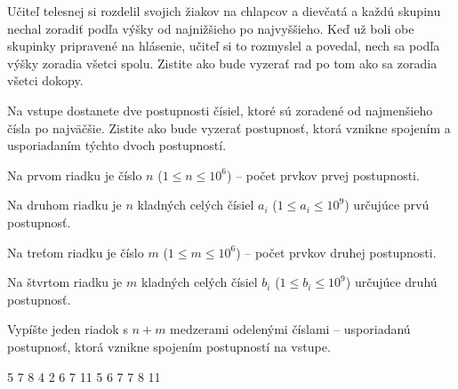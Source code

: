 




Učiteľ telesnej si rozdelil svojich žiakov na chlapcov a dievčatá a každú skupinu nechal zoradiť
podľa výšky od najnižšieho po najvyššieho. Keď už boli obe skupinky pripravené na hlásenie, učiteľ
si to rozmyslel a povedal, nech sa podľa výšky zoradia všetci spolu. Zistite ako bude vyzerať rad po
tom ako sa zoradia všetci dokopy.


Na vstupe dostanete dve postupnosti čísiel, ktoré sú zoradené od najmenšieho čísla po najväčšie.
Zistite ako bude vyzerať postupnosť, ktorá vznikne spojením a usporiadaním týchto dvoch postupností.


Na prvom riadku je číslo $n$ ($1 \leq n \leq 10^6$) -- počet prvkov prvej postupnosti.

Na druhom riadku je $n$ kladných celých čísiel $a_i$ ($1 \leq a_i \leq 10^9$) určujúce prvú
postupnosť.

Na treťom riadku je číslo $m$ ($1 \leq m \leq 10^6$) -- počet prvkov druhej postupnosti.

Na štvrtom riadku je $m$ kladných celých čísiel $b_i$ ($1 \leq b_i \leq 10^9$) určujúce druhú
postupnosť.


Vypíšte jeden riadok s $n+m$ medzerami odelenými číslami -- usporiadanú postupnosť, ktorá vznikne
spojením postupností na vstupe.


5 7 8
4
2 6 7 11
 5 6 7 7 8 11
\koniec


